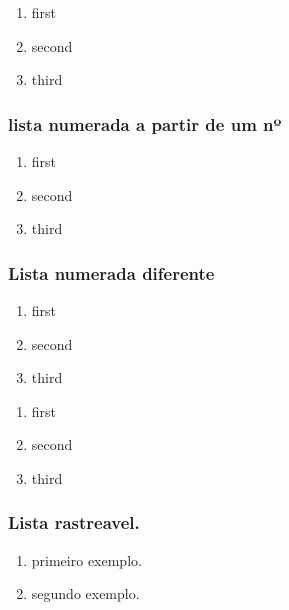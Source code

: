 \begin{enumerate}
\tightlist
\item
  first
\item
  second
\item
  third
\end{enumerate}

\hypertarget{lista-numerada-a-partir-de-um-nuxba}{%
\subsubsection{lista numerada a partir de um
nº}\label{lista-numerada-a-partir-de-um-nuxba}}

\begin{enumerate}
\def\labelenumi{\arabic{enumi}.}
\setcounter{enumi}{6}
\tightlist
\item
  first
\item
  second
\item
  third
\end{enumerate}

\hypertarget{lista-numerada-diferente}{%
\subsubsection{Lista numerada
diferente}\label{lista-numerada-diferente}}

\begin{enumerate}
\def\labelenumi{\roman{enumi}.}
\tightlist
\item
  first
\item
  second
\item
  third
\end{enumerate}

\begin{enumerate}
\def\labelenumi{\arabic{enumi})}
\tightlist
\item
  first
\item
  second
\item
  third
\end{enumerate}

\hypertarget{lista-rastreavel.}{%
\subsubsection{Lista rastreavel.}\label{lista-rastreavel.}}

\begin{enumerate}
\def\labelenumi{(\arabic{enumi})}
\tightlist
\item
  primeiro exemplo.
\item
  segundo exemplo.
\end{enumerate}

